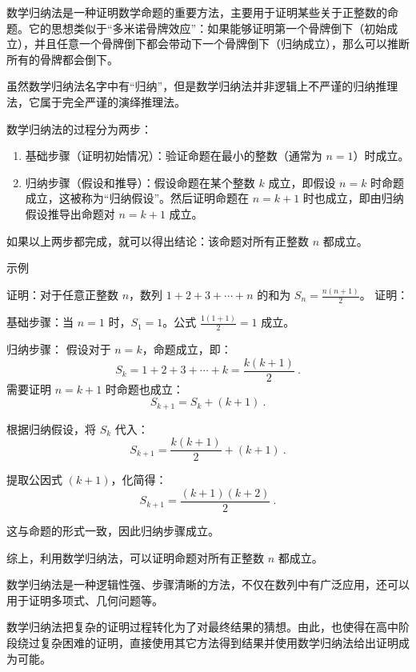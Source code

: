 
\begin{issues}
\issueDraft
\end{issues}

数学归纳法是一种证明数学命题的重要方法，主要用于证明某些关于正整数的命题。它的思想类似于“多米诺骨牌效应”：如果能够证明第一个骨牌倒下（初始成立），并且任意一个骨牌倒下都会带动下一个骨牌倒下（归纳成立），那么可以推断所有的骨牌都会倒下。

虽然数学归纳法名字中有“归纳”，但是数学归纳法并非逻辑上不严谨的归纳推理法，它属于完全严谨的演绎推理法。


数学归纳法的过程分为两步：
\begin{enumerate}
\item 基础步骤（证明初始情况）：验证命题在最小的整数（通常为 $n = 1$）时成立。
\item 归纳步骤（假设和推导）：假设命题在某个整数 $k$ 成立，即假设 $n = k$ 时命题成立，这被称为“归纳假设”。然后证明命题在 $n = k+1$ 时也成立，即由归纳假设推导出命题对 $n = k+1$ 成立。
\end{enumerate}

如果以上两步都完成，就可以得出结论：该命题对所有正整数 $n$ 都成立。

示例
\begin{example}{证明：对于任意正整数 $n$，数列 $1 + 2 + 3 + \cdots + n$ 的和为 $S_n = \frac{n(n+1)}{2}$。}
证明：

基础步骤：当 $n = 1$ 时，$S_1 = 1$。公式 $\frac{1(1+1)}{2} = 1$ 成立。

归纳步骤：
假设对于 $n = k$，命题成立，即：
\begin{equation}
S_k = 1 + 2 + 3 + \cdots + k = \frac{k(k+1)}{2}~.
\end{equation}
需要证明 $n = k+1$ 时命题也成立：
\begin{equation}
S_{k+1} = S_k + (k+1)~.
\end{equation}

根据归纳假设，将 $S_k$ 代入：
\begin{equation}
S_{k+1} = \frac{k(k+1)}{2} + (k+1)~.
\end{equation}

提取公因式 $(k+1)$，化简得：
\begin{equation}
S_{k+1} = \frac{(k+1)(k+2)}{2}~.
\end{equation}

这与命题的形式一致，因此归纳步骤成立。

综上，利用数学归纳法，可以证明命题对所有正整数 $n$ 都成立。
\end{example}

数学归纳法是一种逻辑性强、步骤清晰的方法，不仅在数列中有广泛应用，还可以用于证明多项式、几何问题等。

数学归纳法把复杂的证明过程转化为了对最终结果的猜想。由此，也使得在高中阶段绕过复杂困难的证明，直接使用其它方法得到结果并使用数学归纳法给出证明成为可能。
